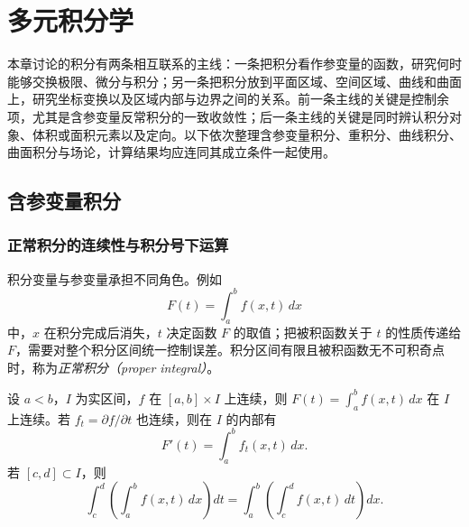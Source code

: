 \setcounter{chapter}{6} %
\chapter{多元积分学}
\label{chap:pei-multivariate-integrals}

本章讨论的积分有两条相互联系的主线：一条把积分看作参变量的函数，研究何时能够交换极限、微分与积分；另一条把积分放到平面区域、空间区域、曲线和曲面上，研究坐标变换以及区域内部与边界之间的关系。前一条主线的关键是控制余项，尤其是含参变量反常积分的一致收敛性；后一条主线的关键是同时辨认积分对象、体积或面积元素以及定向。以下依次整理含参变量积分、重积分、曲线积分、曲面积分与场论，计算结果均应连同其成立条件一起使用。

\section{含参变量积分}
\label{sec:pei-parameter-integrals}

\subsection{正常积分的连续性与积分号下运算}

积分变量与参变量承担不同角色。例如
\[
F(t)=\int_a^b f(x,t)\,dx
\]
中，$x$ 在积分完成后消失，$t$ 决定函数 $F$ 的取值；把被积函数关于 $t$ 的性质传递给 $F$，需要对整个积分区间统一控制误差。积分区间有限且被积函数无不可积奇点时，称为\emph{正常积分（proper integral）}。

\begin{theorem}
\label{thm:pei-proper-parameter}
设 $a<b$，$I$ 为实区间，$f$ 在 $[a,b]\times I$ 上连续，则 $F(t)=\int_a^b f(x,t)\,dx$ 在 $I$ 上连续。若 $f_t=\partial f/\partial t$ 也连续，则在 $I$ 的内部有
\begin{equation}
\label{eq:pei-proper-leibniz}
F'(t)=\int_a^b f_t(x,t)\,dx.
\end{equation}
若 $[c,d]\subset I$，则
\begin{equation}
\label{eq:pei-proper-interchange}
\int_c^d\!\left(\int_a^b f(x,t)\,dx\right)dt
=\int_a^b\!\left(\int_c^d f(x,t)\,dt\right)dx.
\end{equation}
\end{theorem}

